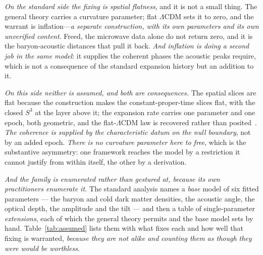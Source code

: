 \documentclass[11pt,a4paper]{article}
\theoremstyle{plain}
\theoremstyle{definition}
\begin{document}
\emph{On the standard side the fixing is spatial flatness}, and it is not a small thing. The general theory
carries a curvature parameter; flat $\Lambda$CDM sets it to zero, and the warrant is inflation---\emph{a
separate construction, with its own parameters and its own unverified content}. Freed, the microwave data
alone do not return zero, and it is the baryon-acoustic distances that pull it back. \emph{And inflation is
doing a second job in the same model}: it supplies the coherent phases the acoustic peaks require, which is
not a consequence of the standard expansion history but an addition to it.

\emph{On this side neither is assumed, and both are consequences.} The spatial slices are flat because the
construction makes the constant-proper-time slices flat, with the closed $S^3$ at the layer above it; the
expansion rate carries one parameter and one epoch, both geometric, and the flat-$\Lambda$CDM law is recovered
rather than posited~\cite{JanzenCRcosmology}. \emph{The coherence is supplied by the characteristic datum on
the null boundary}, not by an added epoch. \emph{There is no curvature parameter here to free}, which is the
substantive asymmetry: one framework reaches the model by a restriction it cannot justify from within itself,
the other by a derivation.

\emph{And the family is enumerated rather than gestured at, because its own practitioners enumerate it.} The
standard analysis names a \emph{base} model of six fitted parameters --- the baryon and cold dark matter
densities, the acoustic angle, the optical depth, the amplitude and the tilt --- and then a table of
single-parameter \emph{extensions}, each of which the general theory permits and the base model sets by hand.
Table~\ref{tab:assumed} lists them with what fixes each and how well that fixing is warranted, \emph{because
they are not alike and counting them as though they were would be worthless}.
\end{document}
